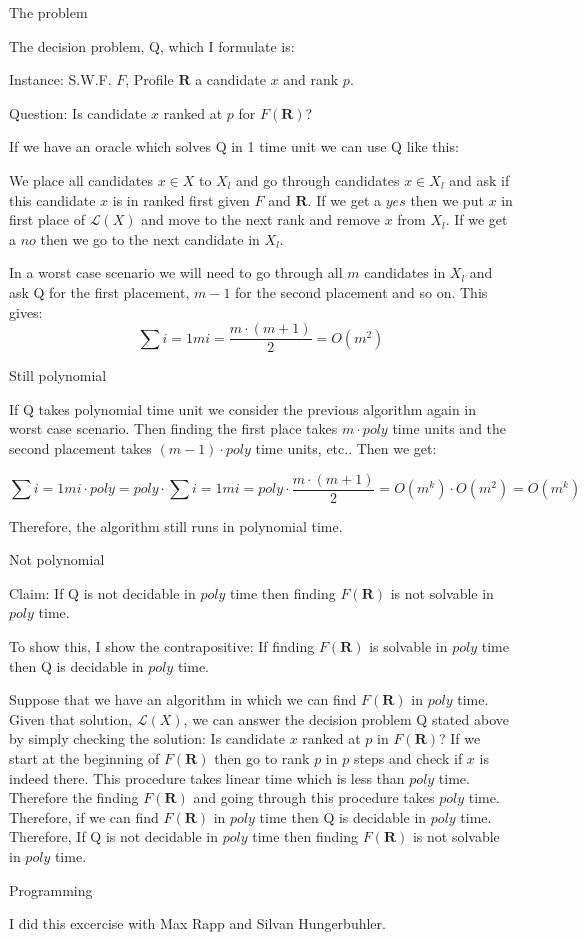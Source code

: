 \documentclass[12pt]{article}
\newenvironment{question}[2][Question]{\begin{trivlist}
\item[\hskip \labelsep {\bfseries #1}\hskip \labelsep {\bfseries #2.}]}{\end{trivlist}}
\newenvironment{answer}[2][Answer]{\begin{trivlist}
\item[\hskip \labelsep {\bfseries #1}\hskip \labelsep {\bfseries #2:}]}{\end{trivlist}}
\begin{document}
\begin{answer}{a)}{The problem}

The decision problem, Q, which I formulate is:

Instance: S.W.F. $F$, Profile $\boldsymbol{R}$ a candidate $x$ and rank $p$.

Question: Is candidate $x$ ranked at $p$ for $F(\boldsymbol{R})$?

If we have an oracle which solves Q in 1 time unit we can use Q like this:

We place all candidates $x \in X$ to $X_l$ and go through candidates $x \in X_l$ and ask if this candidate $x$ is in ranked first given $F$ and $\boldsymbol{R}$. If we get a $yes$ then we put $x$ in first place of $\mathcal{L}(X)$ and move to the next rank and remove $x$ from $X_l$. If we get a $no$ then we go to the next candidate in $X_l$.

In a worst case scenario we will need to go through all $m$ candidates in $X_l$ and ask Q for the first placement, $m-1$ for the second placement and so on. This gives:
$$\sum{i=1}{m}{i}=\frac{m \cdot (m+1)}{2}=O(m^2)$$
\end{answer}

\begin{answer}{b)}{Still polynomial}

If Q takes polynomial time unit we consider the previous algorithm again in worst case scenario. Then finding the first place takes $m \cdot poly$ time units and the second placement takes $(m-1) \cdot poly$ time units, etc.. Then we get:

$$\sum{i=1}{m}{i \cdot poly}=poly \cdot \sum{i=1}{m}{i}=poly \cdot \frac{m \cdot (m+1)}{2}=O(m^k) \cdot O(m^2)=O(m^k)$$

Therefore, the algorithm still runs in polynomial time.
\end{answer}

\begin{answer}{c)}{Not polynomial}

Claim: If Q is not decidable in $poly$ time then finding $F(\boldsymbol{R})$ is not solvable in $poly$ time.

To show this, I show the contrapositive: If finding $F(\boldsymbol{R})$ is solvable in $poly$ time then Q is decidable in $poly$ time.

Suppose that we have an algorithm in which we can find $F(\boldsymbol{R})$ in $poly$ time. Given that solution, $\mathcal{L}(X)$, we can answer the decision problem Q stated above by simply checking the solution: Is candidate $x$ ranked at $p$ in $F(\boldsymbol{R})$? If we start at the beginning of $F(\boldsymbol{R})$ then go to rank $p$ in $p$ steps and check if $x$ is indeed there. This procedure takes linear time which is less than $poly$ time. Therefore the finding $F(\boldsymbol{R})$ and going through this procedure takes $poly$ time. Therefore, if we can find $F(\boldsymbol{R})$ in $poly$ time then Q is decidable in $poly$ time. Therefore, If Q is not decidable in $poly$ time then finding $F(\boldsymbol{R})$ is not solvable in $poly$ time.
\end{answer}

\begin{question}{5}{Programming}

I did this excercise with Max Rapp and Silvan Hungerbuhler.
\end{question}
\end{document}
